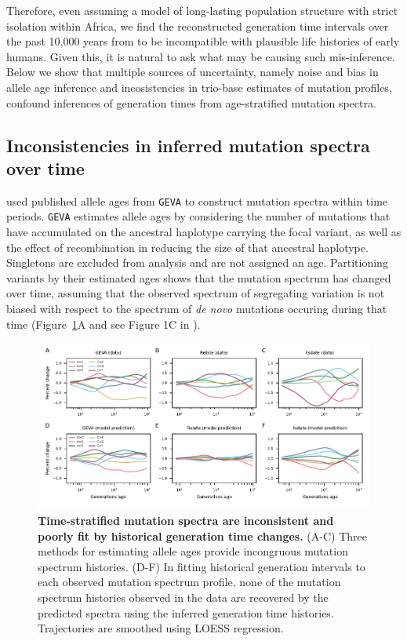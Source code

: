 \documentclass[]{article}
\newcommand{\GEVA}{\texttt{GEVA}\xspace}
\begin{document}
Therefore, even assuming a model of long-lasting population structure with
strict isolation within Africa, we find the reconstructed generation time
intervals over the past 10,000 years from \citet{wang2023human} to be
incompatible with plausible life histories of early humans. Given this, it is
natural to ask what may be causing such mis-inference. Below we show that
multiple sources of uncertainty, namely noise and bias in allele age inference
and incosistencies in trio-base estimates of mutation profiles, confound
inferences of generation times from age-stratified mutation spectra.

\subsection*{Inconsistencies in inferred mutation spectra over time}

\citet{wang2023human} used
published allele ages from \GEVA \citep{albers2020dating}
to construct mutation spectra within time periods. \GEVA estimates
allele ages by considering the number of mutations that have accumulated on the
ancestral haplotype carrying the focal variant, as well as the effect of
recombination in reducing the size of that ancestral haplotype. Singletons are
excluded from analysis and are not assigned an age. Partitioning variants by
their estimated ages shows that the mutation spectrum has changed over time,
assuming that the observed spectrum of segregating variation is not biased with
respect to the spectrum of \emph{de novo} mutations occuring during that time
(Figure~\ref{fig:spectrum-ages}A and see Figure 1C in \citet{wang2023human}).

\begin{figure}[t!]
    \centering
    \includegraphics{../plots/fig1.pdf}
    \caption{
        \textbf{Time-stratified mutation spectra are inconsistent and poorly
        fit by historical generation time changes.} (A-C) Three methods for
        estimating allele ages provide incongruous mutation spectrum histories.
        (D-F) In fitting historical generation intervals to each observed
        mutation spectrum profile, none of the mutation spectrum histories
        observed in the data are recovered by the predicted spectra using the
        inferred generation time histories. Trajectories are smoothed using
        LOESS regression.
    }
    \label{fig:spectrum-ages}
\end{figure}
\end{document}

